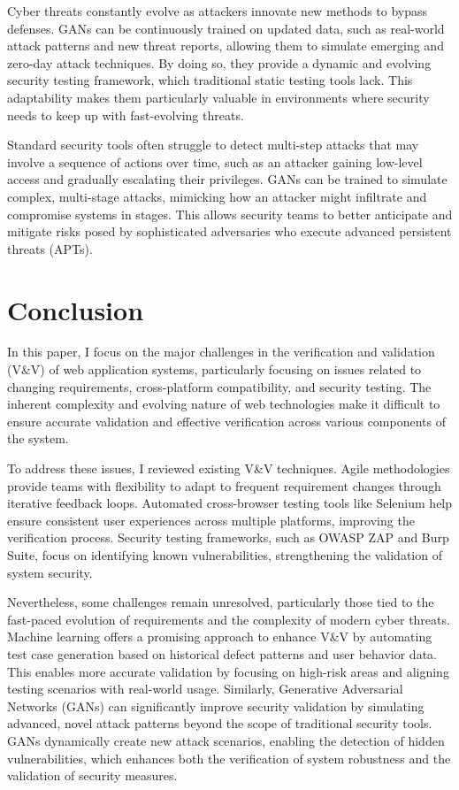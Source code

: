 \documentclass[a4paper, 11pt]{article}  %
\begin{document}
Cyber threats constantly evolve as attackers innovate new methods to bypass defenses. GANs can be continuously trained on updated data, such as real-world attack patterns and new threat reports, allowing them to simulate emerging and zero-day attack techniques. By doing so, they provide a dynamic and evolving security testing framework, which traditional static testing tools lack\cite{chowdhary2023generative}. This adaptability makes them particularly valuable in environments where security needs to keep up with fast-evolving threats.

Standard security tools often struggle to detect multi-step attacks that may involve a sequence of actions over time, such as an attacker gaining low-level access and gradually escalating their privileges. GANs can be trained to simulate complex, multi-stage attacks, mimicking how an attacker might infiltrate and compromise systems in stages. This allows security teams to better anticipate and mitigate risks posed by sophisticated adversaries who execute advanced persistent threats (APTs).

\section{Conclusion}
In this paper, I focus on the major challenges in the verification and validation (V\&V) of web application systems, particularly focusing on issues related to changing requirements, cross-platform compatibility, and security testing. The inherent complexity and evolving nature of web technologies make it difficult to ensure accurate validation and effective verification across various components of the system.

To address these issues, I reviewed existing V\&V techniques. Agile methodologies provide teams with flexibility to adapt to frequent requirement changes through iterative feedback loops. Automated cross-browser testing tools like Selenium help ensure consistent user experiences across multiple platforms, improving the verification process. Security testing frameworks, such as OWASP ZAP and Burp Suite, focus on identifying known vulnerabilities, strengthening the validation of system security.

Nevertheless, some challenges remain unresolved, particularly those tied to the fast-paced evolution of requirements and the complexity of modern cyber threats. Machine learning offers a promising approach to enhance V\&V by automating test case generation based on historical defect patterns and user behavior data. This enables more accurate validation by focusing on high-risk areas and aligning testing scenarios with real-world usage. Similarly, Generative Adversarial Networks (GANs) can significantly improve security validation by simulating advanced, novel attack patterns beyond the scope of traditional security tools. GANs dynamically create new attack scenarios, enabling the detection of hidden vulnerabilities, which enhances both the verification of system robustness and the validation of security measures.
\end{document}
